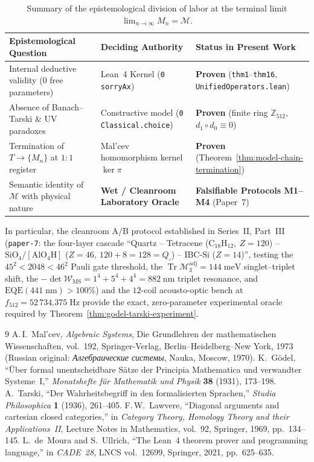 \documentclass[11pt,a4paper]{article}
\theoremstyle{definition}
\theoremstyle{remark}
\begin{document}
\begin{table}[htbp]
\centering
\caption{Summary of the epistemological division of labor at the terminal limit $\lim_{n\to\infty} M_n = \mathcal{M}$.}
\label{tab:epistemological-division}
\small
\begin{tabular}{@{}lll@{}}
\toprule
\textbf{Epistemological Question} & \textbf{Deciding Authority} & \textbf{Status in Present Work} \\
\midrule
Internal deductive validity ($0$ free parameters) & Lean~4 Kernel (\texttt{0 sorryAx}) & \textbf{Proven} (\texttt{thm1}--\texttt{thm16}, \texttt{UnifiedOperators.lean}) \\
Absence of Banach--Tarski \& UV paradoxes & Constructive model (\texttt{0 Classical.choice}) & \textbf{Proven} (finite ring $\mathbb{Z}_{512}$, $d_1\circ d_0\equiv 0$) \\
Termination of $T\to\{M_n\}$ at $1:1$ register & Mal'cev homomorphism kernel $\ker\pi$ & \textbf{Proven} (Theorem~\ref{thm:model-chain-termination}) \\
Semantic identity of $\mathcal{M}$ with physical nature & \textbf{Wet / Cleanroom Laboratory Oracle} & \textbf{Falsifiable Protocols M1--M4} (Paper~7) \\
\bottomrule
\end{tabular}
\end{table}

In particular, the cleanroom A/B protocol established in Series~II, Part~III (\texttt{paper-7}: the four-layer cascade ``Quartz -- Tetracene ($\mathrm{C_{18}H_{12}},\ Z=120$) -- $\mathrm{SiO_4}/[\mathrm{AlO_4H}]$ ($Z=46,\ 120+8=128=Q_\square$) -- IBC-$\mathrm{Si}$ ($Z=14$)'', testing the $45^2 < 2048 < 46^2$ Pauli gate threshold, the $\operatorname{Tr}\mathcal{M}_3^{\mathrm{adj}} = 144\;\text{meV}$ singlet--triplet shift, the $-\det\mathcal{W}_{\mathrm{MS}} = 1^4+5^4+4^4 = 882\;\text{nm}$ triplet resonance, and $\mathrm{EQE}(441\;\text{nm}) > 100\%$) and the $12$-coil acousto-optic bench at $f_{512} = 52\,734.375\;\text{Hz}$ provide the exact, zero-parameter experimental oracle required by Theorem~\ref{thm:godel-tarski-experiment}.

\begin{thebibliography}{9}
A.\,I.~Mal'cev, \emph{Algebraic Systems}, Die Grundlehren der mathematischen Wissenschaften, vol.~192, Springer-Verlag, Berlin--Heidelberg--New York, 1973 (Russian original: \emph{Алгебраические системы}, Nauka, Moscow, 1970).
K.~G\"odel, ``\"Uber formal unentscheidbare S\"atze der Principia Mathematica und verwandter Systeme~I,'' \emph{Monatshefte f\"ur Mathematik und Physik} \textbf{38} (1931), 173--198.
A.~Tarski, ``Der Wahrheitsbegriff in den formalisierten Sprachen,'' \emph{Studia Philosophica} \textbf{1} (1936), 261--405.
F.\,W.~Lawvere, ``Diagonal arguments and cartesian closed categories,'' in \emph{Category Theory, Homology Theory and their Applications~II}, Lecture Notes in Mathematics, vol.~92, Springer, 1969, pp.~134--145.
L.~de~Moura and S.~Ullrich, ``The Lean~4 theorem prover and programming language,'' in \emph{CADE~28}, LNCS vol.~12699, Springer, 2021, pp.~625--635.
\end{thebibliography}
\end{document}
